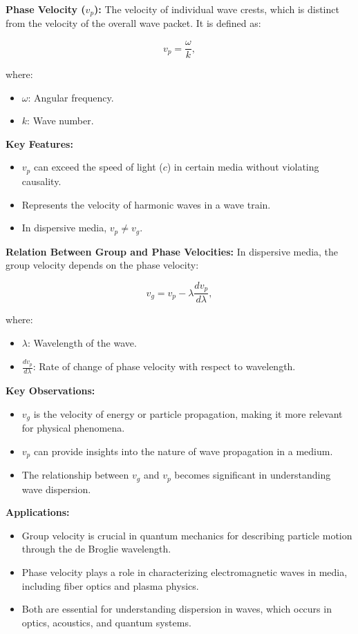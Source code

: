 \documentclass{article}
\newcommand{\eqbox}[1]{\begin{tcolorbox}[colback=gray!10] #1 \end{tcolorbox}}
\newcommand{\conceptbox}[1]{\begin{tcolorbox}[colback=blue!10] #1 \end{tcolorbox}}
\begin{document}
\conceptbox{
\textbf{Phase Velocity (\( v_p \)):}
The velocity of individual wave crests, which is distinct from the velocity of the overall wave packet. It is defined as:
\eqbox{
\[
v_p = \frac{\omega}{k},
\]
}
where:
\begin{itemize}
    \item \( \omega \): Angular frequency.
    \item \( k \): Wave number.
\end{itemize}
\textbf{Key Features:}
\begin{itemize}
    \item \( v_p \) can exceed the speed of light (\( c \)) in certain media without violating causality.
    \item Represents the velocity of harmonic waves in a wave train.
    \item In dispersive media, \( v_p \neq v_g \).
\end{itemize}
}

\conceptbox{
\textbf{Relation Between Group and Phase Velocities:}
In dispersive media, the group velocity depends on the phase velocity:
\eqbox{
\[
v_g = v_p - \lambda \frac{dv_p}{d\lambda},
\]
}
where:
\begin{itemize}
    \item \( \lambda \): Wavelength of the wave.
    \item \( \frac{dv_p}{d\lambda} \): Rate of change of phase velocity with respect to wavelength.
\end{itemize}
}

\conceptbox{
\textbf{Key Observations:}
\begin{itemize}
    \item \( v_g \) is the velocity of energy or particle propagation, making it more relevant for physical phenomena.
    \item \( v_p \) can provide insights into the nature of wave propagation in a medium.
    \item The relationship between \( v_g \) and \( v_p \) becomes significant in understanding wave dispersion.
\end{itemize}
}

\conceptbox{
\textbf{Applications:}
\begin{itemize}
    \item Group velocity is crucial in quantum mechanics for describing particle motion through the de Broglie wavelength.
    \item Phase velocity plays a role in characterizing electromagnetic waves in media, including fiber optics and plasma physics.
    \item Both are essential for understanding dispersion in waves, which occurs in optics, acoustics, and quantum systems.
\end{itemize}
}
\end{document}
